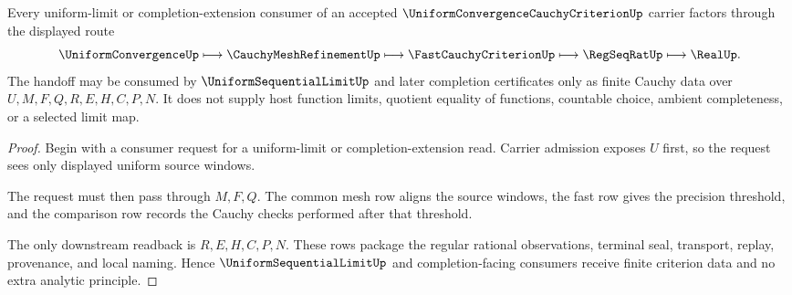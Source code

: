 \begin{theorem}
\label{thm:uniform-convergence-cauchy-criterion-completion-handoff}
Every uniform-limit or completion-extension consumer of an accepted $\UniformConvergenceCauchyCriterionUp$ carrier factors through the displayed route
$$
\UniformConvergenceUp \longmapsto \CauchyMeshRefinementUp \longmapsto \FastCauchyCriterionUp \longmapsto \RegSeqRatUp \longmapsto \RealUp .
$$
The handoff may be consumed by $\UniformSequentialLimitUp$ and later completion certificates only as finite Cauchy data over $U,M,F,Q,R,E,H,C,P,N$. It does not supply host function limits, quotient equality of functions, countable choice, ambient completeness, or a selected limit map.
\end{theorem}
\begin{proof}
Begin with a consumer request for a uniform-limit or completion-extension read. Carrier admission exposes $U$ first, so the request sees only displayed uniform source windows.

The request must then pass through $M,F,Q$. The common mesh row aligns the source windows, the fast row gives the precision threshold, and the comparison row records the Cauchy checks performed after that threshold.

The only downstream readback is $R,E,H,C,P,N$. These rows package the regular rational observations, terminal seal, transport, replay, provenance, and local naming. Hence $\UniformSequentialLimitUp$ and completion-facing consumers receive finite criterion data and no extra analytic principle.
\end{proof}


